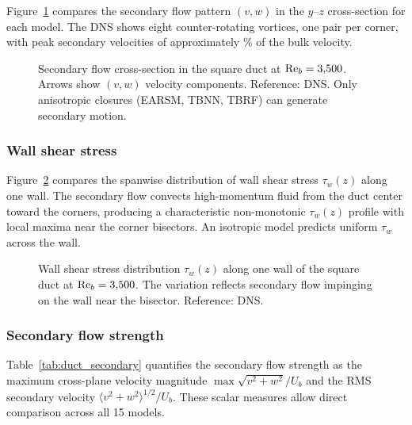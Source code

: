 Figure~\ref{fig:duct_secondary} compares the secondary flow pattern $(v, w)$ in the $y$--$z$ cross-section for each model.
The DNS shows eight counter-rotating vortices, one pair per corner, with peak secondary velocities of approximately \% of the bulk velocity.

\begin{figure}[htbp]
\centering
{}
\caption{Secondary flow cross-section in the square duct at $\mathrm{Re}_b = 3{,}500$. Arrows show $(v, w)$ velocity components. Reference: \citet{Pinelli2010} DNS. Only anisotropic closures (EARSM, TBNN, TBRF) can generate secondary motion.}
\label{fig:duct_secondary}
\end{figure}

\subsubsection{Wall shear stress}

Figure~\ref{fig:duct_tauw} compares the spanwise distribution of wall shear stress $\tau_w(z)$ along one wall.
The secondary flow convects high-momentum fluid from the duct center toward the corners, producing a characteristic non-monotonic $\tau_w(z)$ profile with local maxima near the corner bisectors.
An isotropic model predicts uniform $\tau_w$ across the wall.

\begin{figure}[htbp]
\centering
{}
\caption{Wall shear stress distribution $\tau_w(z)$ along one wall of the square duct at $\mathrm{Re}_b = 3{,}500$. The variation reflects secondary flow impinging on the wall near the bisector. Reference: \citet{Pinelli2010} DNS.}
\label{fig:duct_tauw}
\end{figure}

\subsubsection{Secondary flow strength}

Table~\ref{tab:duct_secondary} quantifies the secondary flow strength as the maximum cross-plane velocity magnitude $\max \sqrt{v^2 + w^2}/U_b$ and the RMS secondary velocity $\langle v^2 + w^2 \rangle^{1/2}/U_b$.
These scalar measures allow direct comparison across all 15 models.

